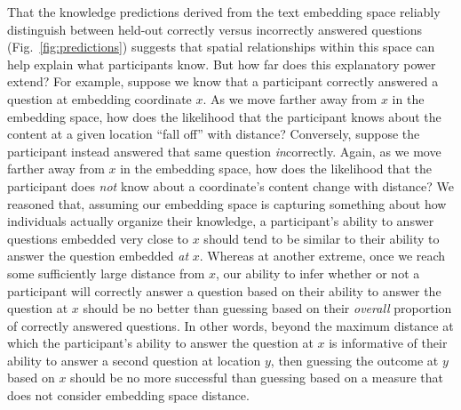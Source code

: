 \documentclass[10pt]{article}
\begin{document}
That the knowledge predictions derived from the text embedding space reliably
distinguish between held-out correctly versus incorrectly answered questions
(Fig.~\ref{fig:predictions}) suggests that spatial relationships within this
space can help explain what participants know. But how far does this
explanatory power extend? For example, suppose we know that a participant
correctly answered a question at embedding coordinate $x$. As we move farther
away from $x$ in the embedding space, how does the likelihood that the
participant knows about the content at a given location ``fall off'' with
distance? Conversely, suppose the participant instead answered that same
question \textit{in}correctly. Again, as we move farther away from $x$ in the
embedding space, how does the likelihood that the participant does \textit{not}
know about a coordinate's content change with distance? We reasoned that,
assuming our embedding space is capturing something about how individuals
actually organize their knowledge, a participant's ability to answer questions
embedded very close to $x$ should tend to be similar to their ability to answer
the question embedded \textit{at} $x$. Whereas at another extreme, once we
reach some sufficiently large distance from $x$, our ability to infer whether
or not a participant will correctly answer a question based on their ability to
answer the question at $x$ should be no better than guessing based on their
\textit{overall} proportion of correctly answered questions. In other words,
beyond the maximum distance at which the participant's ability to answer the
question at $x$ is informative of their ability to answer a second question at
location $y$, then guessing the outcome at $y$ based on $x$ should be no more
successful than guessing based on a measure that does not consider embedding
space distance.
\end{document}
